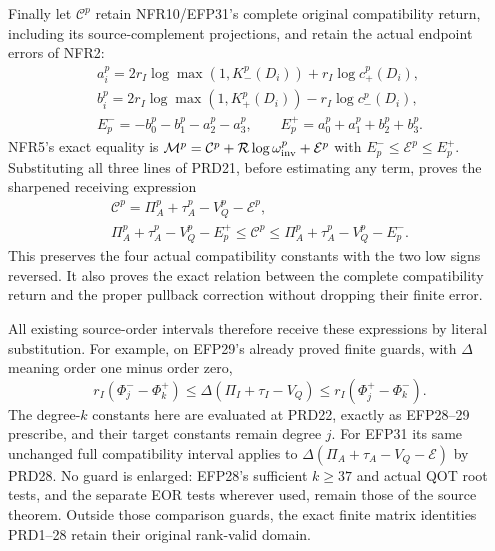 \documentclass[11pt,a4paper]{article}
\begin{document}
Finally let $\mathcal C^p$ retain NFR10/EFP31's complete original
compatibility return, including its source-complement projections,
and retain the actual endpoint errors of NFR2:
\[
\begin{gathered}
 a_i^p=2r_I\log\max(1,K_-^p(D_i))+r_I\log c_+^p(D_i),\\
 b_i^p=2r_I\log\max(1,K_+^p(D_i))-r_I\log c_-^p(D_i),\\
 E_p^-=-b_0^p-b_1^p-a_2^p-a_3^p,\qquad
 E_p^+=a_0^p+a_1^p+b_2^p+b_3^p.
\end{gathered}                                                    \tag{PRD27}
\]
NFR5's exact equality is
$\mathcal M^p=\mathcal C^p+\mathcal R\log\omega_{\rm inv}^p
                  +\mathcal E^p$ with
$E_p^-\le\mathcal E^p\le E_p^+$.
Substituting all three lines of PRD21, before estimating any
term, proves the sharpened receiving expression
\[
\begin{gathered}
 \mathcal C^p=\Pi_A^p+\tau_A^p-V_Q^p-\mathcal E^p,\\
 \Pi_A^p+\tau_A^p-V_Q^p-E_p^+
 \le\mathcal C^p\le
 \Pi_A^p+\tau_A^p-V_Q^p-E_p^- .
\end{gathered}                                                    \tag{PRD28}
\]
This preserves the four actual compatibility constants with the
two low signs reversed. It also proves the exact relation
between the complete compatibility return and the proper
pullback correction without dropping their finite error.

All existing source-order intervals therefore receive these
expressions by literal substitution. For example, on EFP29's
already proved finite guards, with $\Delta$ meaning order one
minus order zero,
\[
 r_I(\Phi_j^- -\Phi_k^+)
 \le\Delta(\Pi_I+\tau_I-V_Q)
 \le r_I(\Phi_j^+ -\Phi_k^-).                           \tag{PRD29}
\]
The degree-$k$ constants here are evaluated at PRD22, exactly as
EFP28--29 prescribe, and their target constants remain degree $j$.
For EFP31 its same unchanged full compatibility interval applies
to $\Delta(\Pi_A+\tau_A-V_Q-\mathcal E)$ by PRD28.
No guard is enlarged: EFP28's sufficient $k\ge37$ and actual
QOT root tests, and the separate EOR tests wherever used, remain
those of the source theorem. Outside those comparison guards,
the exact finite matrix identities PRD1--28 retain their original
rank-valid domain.
\endgroup

\begingroup
\end{document}
